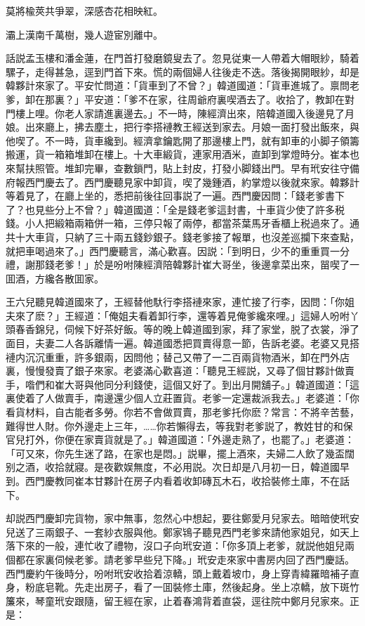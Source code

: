 莫將楡莢共爭翠，深感杏花相映紅。

灞上漢南千萬樹，幾人遊宦別離中。

話説孟玉樓和潘金蓮，在門首打發磨鏡叟去了。忽見従東一人帶着大帽眼紗，騎着騾子，走得甚急，逕到門首下來。慌的兩個婦人往後走不迭。落後揭開眼紗，却是韓夥計來家了。平安忙問道：「貨車到了不曾？」韓道國道：「貨車進城了。禀問老爹，卸在那裏？」平安道：「爹不在家，往周爺府裏喫酒去了。收拾了，教卸在對門樓上哩。你老人家請進裏邊去。」不一時，陳經濟出來，陪韓道國入後邊見了月娘。出來廳上，拂去塵土，把行李搭褳教王經送到家去。月娘一面打發出飯來，與他喫了。不一時，貨車纔到。經濟拿鑰匙開了那邊樓上門，就有卸車的小脚子領籌搬運，貨一箱箱堆卸在樓上。十大車緞貨，連家用酒米，直卸到掌燈時分。崔本也來幫扶照管。堆卸完畢，查數鎖門，貼上封皮，打發小脚錢出門。早有玳安往守備府報西門慶去了。西門慶聽見家中卸貨，喫了幾鍾酒，約掌燈以後就來家。韓夥計等着見了，在廳上坐的，悉把前後往回事説了一遍。西門慶因問：「錢老爹書下了？也見些分上不曾？」韓道國道：「全是錢老爹這封書，十車貨少使了許多税錢。小人把緞箱兩箱併一箱，三停只報了兩停，都當茶葉馬牙香櫃上税過來了。通共十大車貨，只納了三十兩五錢鈔銀子。錢老爹接了報單，也沒差巡攔下來查點，就把車喝過來了。」西門慶聽言，滿心歡喜。因説：「到明日，少不的重重買一分禮，謝那錢老爹！」於是吩咐陳經濟陪韓夥計崔大哥坐，後邊拿菜出來，㽞喫了一囬酒，方纔各散囬家。

王六兒聽見韓道國來了，王經替他馱行李搭褳來家，連忙接了行李，因問：「你姐夫來了麽？」王經道：「俺姐夫看着卸行李，還等着見俺爹纔來哩。」這婦人吩咐丫頭春香錦兒，伺候下好茶好飯。等的晚上韓道國到家，拜了家堂，脱了衣裳，淨了面目，夫妻二人各訴離情一遍。韓道國悉把買賣得意一節，告訴老婆。老婆又見搭褳内沉沉重重，許多銀兩，因問他；替己又帶了一二百兩貨物酒米，卸在門外店裏，慢慢發賣了銀子來家。老婆滿心歡喜道：「聽見王經説，又尋了個甘夥計做賣手，喒們和崔大哥與他同分利錢使，這個又好了。到出月開舖子。」韓道國道：「這裏使着了人做賣手，南邊還少個人立莊置貨。老爹一定還裁派我去。」老婆道：「你看貨材料，自古能者多勞。你若不會做買賣，那老爹托你麽？常言：不將辛苦藝，難得世人財。你外邊走上三年，……你若懶得去，等我對老爹説了，教姓甘的和保官兒打外，你便在家賣貨就是了。」韓道國道：「外邊走熟了，也罷了。」老婆道：「可又來，你先生迷了路，在家也是悶。」説畢，擺上酒來，夫婦二人飲了幾盃闊别之酒，收拾就寢。是夜歡娱無度，不必用説。次日却是八月初一日，韓道國早到。西門慶教同崔本甘夥計在房子内看着收卸磚瓦木石，收拾裝修土庫，不在話下。

却説西門慶卸完貨物，家中無事，忽然心中想起，要往鄭愛月兒家去。暗暗使玳安兒送了三兩銀子、一套紗衣服與他。鄭家鴇子聽見西門老爹來請他家姐兒，如天上落下來的一般，連忙收了禮物，沒口子向玳安道：「你多頂上老爹，就説他姐兒兩個都在家裏伺候老爹。請老爹早些兒下降。」玳安走來家中書房内回了西門慶話。西門慶約午後時分，吩咐玳安收拾着涼轎，頭上戴着坡巾，身上穿青緯羅暗補子直身，粉底皂靴。先走出房子，看了一囬裝修土庫，然後起身。坐上凉轎，放下斑竹簾來，琴童玳安跟隨，留王經在家，止着春鴻背着直袋，逕往院中鄭月兒家來。正是：

